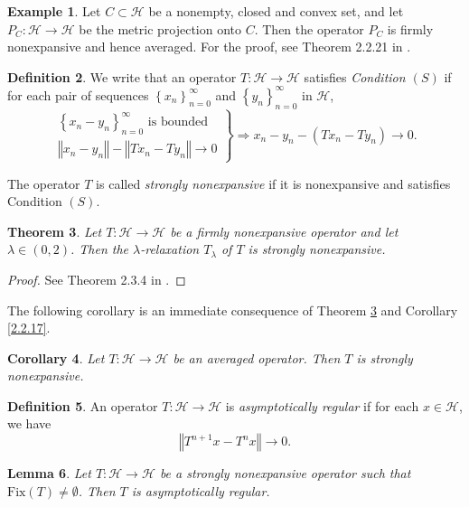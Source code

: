 \documentclass[]{interact}
\theoremstyle{plain}%
\newtheorem{theorem}{Theorem}[section]
\newtheorem{lemma}[theorem]{Lemma}
\newtheorem{corollary}[theorem]{Corollary}
\theoremstyle{definition}
\newtheorem{definition}[theorem]{Definition}
\newtheorem{example}[theorem]{Example}
\theoremstyle{remark}
\begin{document}
\begin{example}
\label{thm:2.2.21}Let $C\subset\mathcal{H}$ be a nonempty, closed
and convex set, and let $P_{C}:\mathscr{\mathcal{H}\rightarrow\mathcal{H}}$
be the metric projection onto $C$. Then the operator $P_{C}$ is
firmly nonexpansive and hence averaged. For the proof, see Theorem
2.2.21 in \cite{key-11}.
\end{example}
\begin{definition}
\label{SNE}We write that an operator $T:\mathcal{H}\rightarrow\mathcal{H}$
satisfies \textit{Condition $\left(S\right)$ }if for each pair of
sequences $\left\{ x_{n}\right\} _{n=0}^{\infty}$ and $\left\{ y_{n}\right\} _{n=0}^{\infty}$
in $\mathcal{H}$,
\vspace{-.2cm}
\[
\left.\begin{array}{l}
\left\{ x_{n}-y_{n}\right\} _{n=0}^{\infty}\,\,\mathrm{is}\,\mathrm{\,bounded}\\
\left\Vert x_{n}-y_{n}\right\Vert -\left\Vert Tx_{n}-Ty_{n}\right\Vert \rightarrow0
\end{array}\right\} \Longrightarrow x_{n}-y_{n}-\left(Tx_{n}-Ty_{n}\right)\rightarrow0.
\]

The operator $T$ is called \textit{strongly nonexpansive }if it is
nonexpansive and satisfies Condition $\left(S\right)$.
\end{definition}
\begin{theorem}
\label{2.3.4}Let $T:\mathcal{H}\rightarrow\mathcal{H}$ be a firmly
nonexpansive operator and let $\lambda\in\left(0,2\right)$. Then
the $\lambda$-relaxation $T_{\lambda}$ of $T$ is strongly nonexpansive.
\end{theorem}
\begin{proof}
See Theorem 2.3.4 in \cite{key-11}.
\end{proof}
The following corollary is an immediate consequence of Theorem \ref{2.3.4}
and Corollary \ref{2.2.17}.
\begin{corollary}
\label{averaged is strongly non expansive}Let $T:\mathcal{H}\rightarrow\mathcal{H}$
be an averaged operator. Then $T$ is strongly nonexpansive.
\end{corollary}
\begin{definition}
An operator $T:\mathcal{H}\rightarrow\mathcal{H}$ is \textit{asymptotically
regular }if for each $x\in\mathcal{H}$, we have
\[
\left\Vert T^{n+1}x-T^{n}x\right\Vert \rightarrow0.
\]
\end{definition}
\begin{lemma}
\label{Strongly nonexpansive  is asymptotically regular} Let $T:\mathcal{H}\rightarrow\mathcal{H}$
be a strongly nonexpansive operator such that $\mathrm{Fix}\left(T\right)\not=\emptyset$.
Then $T$ is asymptotically regular.
\end{lemma}
\end{document}
